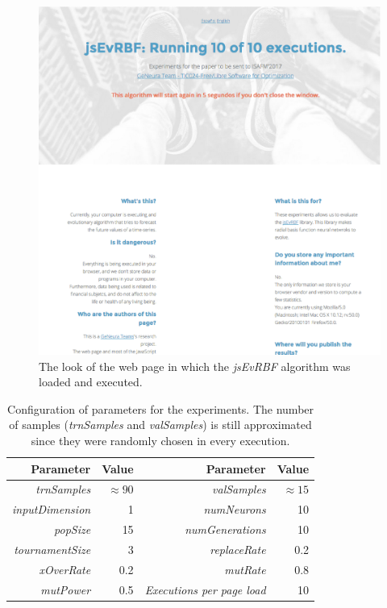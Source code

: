 \documentclass{article}
\begin{document}
\newpage
\clearpage

\begin{figure}[!ht]
\includegraphics[width=120mm]{example-of-execution-isafm.eps}
\caption{The look of the web page in which the {\em jsEvRBF} algorithm was loaded and executed.}
\label{fig:example-of-execution}
\end{figure}
\newpage
\clearpage


\setlength{\tabcolsep}{10pt}
\begin{table}
\caption{Configuration of parameters for the experiments. The number of samples ({\em trnSamples} and {\em valSamples}) is still approximated since they were randomly chosen in every execution.}
\label{tab:parameters-experiments}
\begin{center}
\begin{tabular}{rr|rr}
{\bf Parameter} & {\bf Value} &
{\bf Parameter} & {\bf Value}\\
\hline
{\em trnSamples} & $\approx 90$ &
{\em valSamples} & $\approx 15$  \\
{\em inputDimension} &   1 &
{\em numNeurons} &  10 \\
{\em popSize} &  15 &
{\em numGenerations} & 10  \\
{\em tournamentSize} &  3 &
{\em replaceRate} &   0.2 \\
{\em xOverRate} &  0.2&
{\em mutRate} &   0.8  \\
{\em mutPower} &  0.5 &
{\em Executions per page load} & 10 \\
\hline
\end{tabular}
\end{center}
\end{table}
\end{document}
